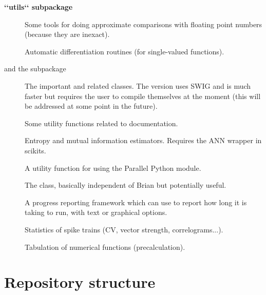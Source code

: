 \documentclass[letterpaper,10pt,english]{manual}
\begin{document}
\textbf{{}`{}`utils{}`{}` subpackage}
\begin{description}
\item[] \leavevmode
Some tools for doing approximate comparisons with floating point numbers
(because they are inexact).

\item[] \leavevmode
Automatic differentiation routines (for single-valued functions).

\item[ and the  subpackage] \leavevmode
The important  and related classes. The  version
uses SWIG and is much faster but requires the user to compile themselves
at the moment (this will be addressed at some point in the future).

\item[] \leavevmode
Some utility functions related to documentation.

\item[] \leavevmode
Entropy and mutual information estimators. Requires the ANN wrapper in scikits.

\item[] \leavevmode
A utility function for using the Parallel Python module.

\item[] \leavevmode
The  class, basically independent of Brian but
potentially useful.

\item[] \leavevmode
A progress reporting framework which  can use to report
how long it is taking to run, with text or graphical options.

\item[] \leavevmode
Statistics of spike trains (CV, vector strength, correlograms...).

\item[] \leavevmode
Tabulation of numerical functions (precalculation).

\end{description}

\resetcurrentobjects
\hypertarget{--doc-developer-repositorystructure}{}

\section{Repository structure}
\end{document}
